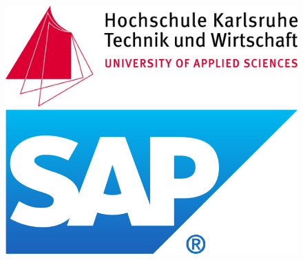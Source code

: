 
\thispagestyle{plain}

\begin{titlepage}
	\enlargethispage{4.0cm}

	\begin{center}
		\begin{figure}
			\centering
			\begin{minipage}{.5\textwidth}
			  	\centering
			  	\includegraphics[width=.7\textwidth]{Figures/icon_hs_ka.jpg}
			\end{minipage}%
			\begin{minipage}{.5\textwidth}
			  	\centering
			  	\includegraphics[width=.5\textwidth]{Figures/icon_sap.png}
			\end{minipage}
			\vspace{3.0cm}
		\end{figure}


\end{center}
\end{titlepage}
